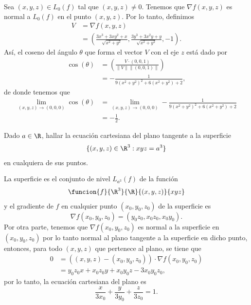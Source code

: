 \documentclass[a4,11pt]{aleph-examen}
\begin{document}
\begin{preguntas}
\begin{respuesta}
\begin{respuesta}
\begin{respuesta}
    Sea $(x,y,z)\in L_0(f)$ tal que $(x,y,z)\neq 0$. Tenemos que $\nabla f(x,y,z)$ es normal a $L_0(f)$ en el punto $(x,y,z)$. Por lo tanto, definimos
    \begin{align*}
        V
            & =\nabla f(x,y,z)\\
            & =\left(\frac{3x^3+3xy^2+x}{\sqrt{x^2+y^2}},\frac{3y^3+3x^2y+y}{\sqrt{x^2+y^2}},-1\right).
    \end{align*}
    Así, el coseno del ángulo $\theta$ que forma el vector $V$ con el eje $z$ está dado por
    \begin{align*}
        \cos (\theta)
            & = \left( \frac{V \cdot (0,0,1)}{\|V\| \|(0,0,1)\|} \right) \\
            & = -\frac{1}{9(x^2+y^2)^2+6(x^2+y^2)+2},
    \end{align*}
    de donde tenemos que
    \begin{align*}
        \lim_{(x,y,z) \to (0,0,0)}\cos (\theta)
            & = \lim_{(x,y,z) \to (0,0,0)} -\frac{1}{9(x^2+y^2)^2+6(x^2+y^2)+2} \\
            & = -\frac{1}{2}.
    \end{align*}
\end{respuesta}

\item
    Dado $a\in\R$, hallar la ecuación cartesiana del plano tangente a la superficie 
    \[
       \{(x,y,z)\in\R^3 : xyz=a^3\}
    \]
    en cualquiera de sus puntos.
	
\begin{respuesta}
    La superficie es el conjunto de nivel $L_{a^3}(f)$ de la función 
    \[ 
        \funcion {f}{\R^3}{\R}{(x,y,z)}{xyz}
    \]
    y el gradiente de $f$ en cualquier punto $(x_0,y_0,z_0)$ de la superficie es
    \[
        \nabla f(x_0,y_0,z_0)=(y_0z_0,x_0z_0,x_0y_0).
    \]
    Por otra parte, tenemos que $\nabla f(x_0,y_0,z_0)$ es normal a la superficie en $(x_0,y_0,z_0)$ por lo tanto normal al plano tangente a la superficie en dicho punto, entonces, para todo $(x,y,z)$ que pertenece al plano, se tiene que
    \begin{align*}
        0
            & = ((x,y,z)-(x_0,y_0,z_0)) \cdot \nabla f(x_0,y_0,z_0) \\
            & = y_0z_0x+x_0z_0y+x_0y_0z-3x_0y_0z_0,
    \end{align*}
    por lo tanto, la ecuación cartesiana del plano es
    \[
        \frac{x}{3x_0}+\frac{y}{3y_0}+\frac{z}{3z_0}=1.
    \]
\end{respuesta}


\end{respuesta}
\end{respuesta}
\end{preguntas}
\end{document}
